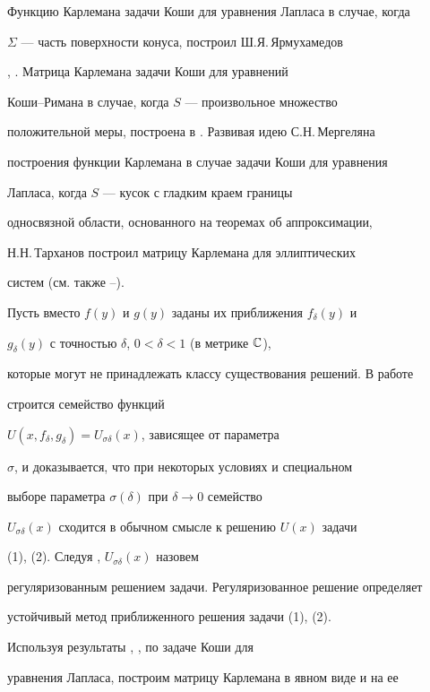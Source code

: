 Функцию Карлемана задачи Коши для уравнения Лапласа в случае, когда 


$\Sigma$ --- часть поверхности конуса, построил Ш.Я.\,Ярмухамедов 


\cite{4}, \cite{2}. Матрица Карлемана задачи Коши для уравнений


Коши--Римана в случае, когда $S$ --- произвольное множество 


положительной меры, построена в \cite{5}. Развивая идею С.Н.\,Мергеляна 


\cite{6} построения функции Карлемана в случае задачи Коши для уравнения


Лапласа, когда $S$ --- кусок с гладким краем границы 


односвязной области, основанного на теоремах об аппроксимации, 


Н.Н.\,Тарханов \cite{7} построил матрицу Карлемана для эллиптических 


систем (см. также \cite{8}--\cite{15}). 


 


Пусть вместо $f(y)$ и $g(y)$ заданы их приближения $f_\delta(y)$ и 


$g_\delta(y)$ с точностью $\delta$, $0<\delta<1$ (в метрике $\Bbb C$), 


которые могут не принадлежать классу существования решений. В работе 


строится семейство функций 


$U(x,f_\delta,g_\delta)=U_{\sigma\delta}(x)$, зависящее от параметра 


$\sigma$, и доказывается, что при некоторых условиях и специальном 


выборе параметра $\sigma(\delta)$ при $\delta\to 0$ семейство 


$U_{\sigma\delta}(x)$ сходится в обычном смысле к решению $U(x)$ задачи 


(1), (2). Следуя \cite{8}, $U_{\sigma\delta}(x)$ назовем 


регуляризованным решением задачи. Регуляризованное решение определяет 


устойчивый метод приближенного решения задачи (1), (2). 


 


Используя результаты \cite{9}, \cite{10}, \cite{4} по задаче Коши для 


уравнения Лапласа, построим матрицу Карлемана в явном виде и на ее 


